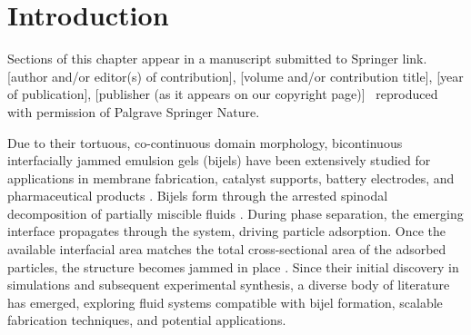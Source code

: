 \section{Introduction}

Sections of this chapter appear in a manuscript submitted to Springer link.
[author and/or editor(s) of contribution], [volume and/or contribution title], [year of publication], [publisher (as it appears on our copyright page)] \
reproduced with permission of Palgrave Springer Nature. 


Due to their tortuous, co-continuous domain morphology, bicontinuous interfacially jammed emulsion gels (bijels) have been 
extensively studied for applications in membrane fabrication, catalyst supports, battery electrodes, and pharmaceutical 
products \cite{yabuno_preparation_2020, samdani_bicontinuous_2017, cha_bicontinuous_2019, garcia_scalable_2019, santiago_cordoba_aerobijels_2020}.  
Bijels form through the arrested spinodal decomposition of partially miscible fluids 
\cite{stratford_colloidal_2005, herzig_bicontinuous_2007, tavacoli_novel_2011}. During phase separation, the emerging interface propagates 
through the system, driving particle adsorption. Once the available interfacial area matches the total cross-sectional area of the adsorbed 
particles, the structure becomes jammed in place \cite{stratford_colloidal_2005, herzig_bicontinuous_2007, tavacoli_novel_2011}. Since their 
initial discovery in simulations and subsequent experimental synthesis, a diverse body of literature has emerged, exploring fluid systems 
compatible with bijel formation, scalable fabrication techniques, and potential applications.

